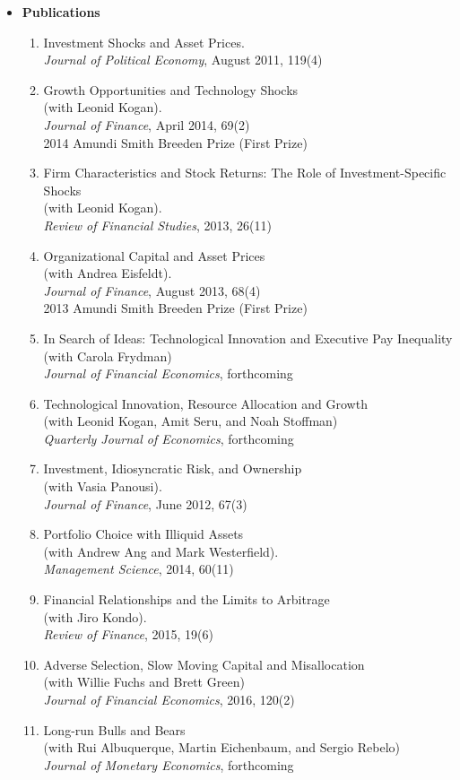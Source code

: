 \documentclass[11pt,letterpaper,serif,overlapped]{res}
\begin{document}
\begin{resume}
\begin{itemize}
\item \textbf{Publications}
\begin{enumerate}
\item Investment Shocks and Asset Prices.\\
\emph{Journal of Political Economy},  August 2011, 119(4)
\item Growth Opportunities and Technology Shocks\\ (with Leonid Kogan).\\
\emph{Journal of Finance}, April 2014, 69(2)\\
 2014 Amundi Smith Breeden Prize (First Prize)
\item Firm Characteristics and Stock Returns: The Role of Investment-Specific Shocks\\ (with Leonid Kogan).\\
\emph{Review of Financial Studies}, 2013, 26(11)
\item Organizational Capital and Asset Prices\\ (with Andrea Eisfeldt).\\
\emph{Journal of Finance}, August 2013, 68(4)\\
 2013 Amundi Smith Breeden Prize (First Prize)
\item In Search of Ideas: Technological Innovation and Executive Pay Inequality\\ (with Carola Frydman)\\
\emph{Journal of Financial Economics}, forthcoming
\item Technological Innovation, Resource Allocation and Growth\\ (with Leonid Kogan, Amit Seru, and Noah Stoffman)\\
\emph{Quarterly Journal of Economics}, forthcoming
\item Investment, Idiosyncratic Risk, and Ownership\\ (with Vasia Panousi).\\
\emph{Journal of Finance}, June 2012, 67(3)
\item Portfolio Choice with Illiquid Assets\\ (with Andrew Ang and Mark Westerfield).\\
\emph{Management Science},  2014, 60(11)
\item Financial Relationships and the Limits to Arbitrage\\ (with Jiro Kondo).\\
\emph{Review of Finance}, 2015, 19(6)
\item Adverse Selection, Slow Moving Capital and Misallocation\\ (with Willie Fuchs and Brett Green)\\
\emph{Journal of Financial Economics}, 2016, 120(2)
\item Long-run Bulls and Bears\\ (with Rui Albuquerque, Martin Eichenbaum, and Sergio Rebelo)\\
\emph{Journal of Monetary Economics}, forthcoming
\end{enumerate}


\end{itemize}
\end{resume}
\end{document}
